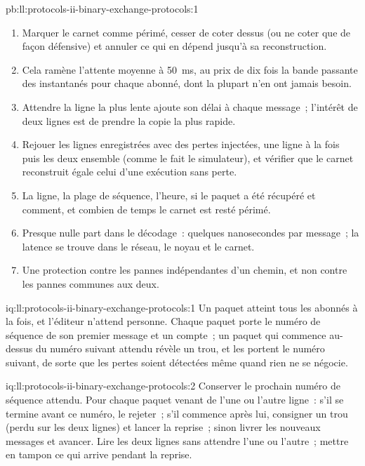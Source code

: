 \begin{solution}{pb:ll:protocols-ii-binary-exchange-protocols:1}
\begin{enumerate}
soit environ 12 paquets par session à 50\,000 par seconde~; une cause commune de $10^{-6}$ le porte à $1.01 \times 10^{-6}$, soit environ 1\,180 par
session. La reprise sur un cycle d'instantanés d'une seconde prend \qty{0.52}{\second} en moyenne et \qty{1.02}{\second} au pire,
contre \qty{0.5}{\milli\second} pour une retransmission.
\item Marquer le carnet comme périmé, cesser de coter dessus (ou ne coter que de façon défensive) et annuler ce qui en dépend jusqu'à sa reconstruction.
\item Cela ramène l'attente moyenne à \qty{50}{\milli\second}, au prix de dix fois la bande passante des instantanés pour
chaque abonné, dont la plupart n'en ont jamais besoin.
\item Attendre la ligne la plus lente ajoute son délai à chaque message~; l'intérêt de deux lignes est de prendre la copie la plus rapide.
\item Rejouer les lignes enregistrées avec des pertes injectées, une ligne à la fois puis les deux ensemble (comme le fait le simulateur), et vérifier que
le carnet reconstruit égale celui d'une exécution sans perte.
\item La ligne, la plage de séquence, l'heure, si le paquet a été récupéré et comment, et combien de temps le carnet est resté périmé.
\item Presque nulle part dans le décodage~: quelques nanosecondes par message~; la latence se trouve dans le réseau, le noyau et le carnet.
\item Une protection contre les pannes indépendantes d'un chemin, et non contre les pannes communes aux deux.
\end{enumerate}
\end{solution}

\begin{solution}{iq:ll:protocols-ii-binary-exchange-protocols:1}
Un paquet atteint tous les abonnés à la fois, et l'éditeur n'attend personne. Chaque paquet porte le numéro de séquence de son premier
message et un compte~; un paquet qui commence au-dessus du numéro suivant attendu révèle un trou, et les  portent le numéro
suivant, de sorte que les pertes soient détectées même quand rien ne se négocie.
\end{solution}

\begin{solution}{iq:ll:protocols-ii-binary-exchange-protocols:2}
Conserver le prochain numéro de séquence attendu. Pour chaque paquet venant de l'une ou l'autre ligne~: s'il se termine avant ce numéro, le rejeter~; s'il commence
après lui, consigner un trou (perdu sur les deux lignes) et lancer la reprise~; sinon livrer les nouveaux messages et avancer. Lire les deux lignes
sans attendre l'une ou l'autre~; mettre en tampon ce qui arrive pendant la reprise.
\end{solution}

